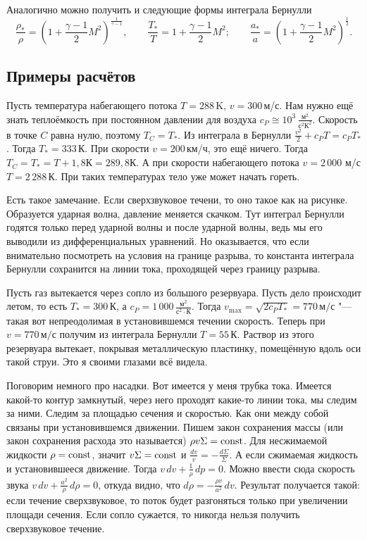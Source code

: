 Аналогично можно получить и следующие формы интеграла Бернулли
\[
  \frac{\rho_*}\rho = \left(1+\frac{\gamma-1}2 M^2\right)^{\frac1{\gamma-1}},\qquad \frac{T_*}T = 1+\frac{\gamma-1}2 M^2;\qquad \frac{a_*}a=\left(1+\frac{\gamma-1}2M^2\right)^{\frac12}.
\]

\subsection{Примеры расчётов}
Пусть температура набегающего потока $T=288$\,K, $v=300$\,м/с. Нам нужно ещё знать теплоёмкость при постоянном давлении для воздуха $c_P\cong 10^3\,\frac{\text{м}^2}{\text{с}^2\text{К}^2}$. Скорость в точке $C$ равна нулю, поэтому $T_C = T_*$. Из интеграла в Бернулли $\frac{v^2}2+c_P T=c_PT_*$. Тогда $T_* = 333\,$К. При скорости $v = 200$\,км/ч, это ещё ничего. Тогда $T_C = T_* = T+1{,}8\text{К}=289{,}8\text{К}$. А при скорости набегающего потока $v = 2\,000\,$\,м/с $T = 2\,288$\,К. При таких температурах тело уже может начать гореть.

Есть такое замечание. Если сверхзвуковое течени, то оно такое как на рисунке. Образуется ударная волна, давление меняется скачком. Тут интеграл Бернулли годятся только перед ударной волны и после ударной волны, ведь мы его выводили из дифференциальных уравнений. Но оказывается, что если внимательно посмотреть на условия на границе разрыва, то константа интеграла Бернулли сохранится на линии тока, проходящей через границу разрыва.

Пусть газ вытекается через сопло из большого резервуара. Пусть дело происходит летом, то есть $T_* = 300$\,К, а $c_P = 1\,000\,\frac{\text{м}^2}{\text{с}^2\cdot \text{К}}$. Тогда $v_{\max} = \sqrt{2 c_P T_*} = 770\,\text{м}/\text{с}$ "--- такая вот непреодолимая в установившемся течении скорость. Теперь при $v=770\,\text{м}/\text{с}$ получим из интеграла Бернулли $T = 55$\,К. Раствор из этого резервуара вытекает, покрывая металлическую пластинку, помещённую вдоль оси такой струи. Это я своими глазами всё видела.

Поговорим немного про насадки. Вот имеется у меня трубка тока. Имеется какой-то контур замкнутый, через него проходят какие-то линии тока, мы следим за ними. Следим за площадью сечения и скоростью. Как они между собой связаны при установившемся движении. Пишем закон сохранения массы (или закон сохранения расхода это называется) $\rho v \Sigma = \operatorname{const}$. Для несжимаемой жидкости  $\rho=\operatorname{const}$, значит $v\Sigma=\operatorname{const}$ и $\frac{dv}{v} = -\frac{d\Sigma}\Sigma$. А если сжимаемая жидкость и установившееся движение. Тогда $v\,dv + \frac1\rho\,dp = 0$. Можно ввести сюда скорость звука $v\,dv + \frac{a^2}\rho\,d\rho = 0$, откуда видно, что $d\rho = -\frac{\rho v}{a^2}\,dv$. Результат получается такой: если течение сверхзвуковое, то поток будет разгоняться только при увеличении площади сечения. Если сопло сужается, то никогда нельзя получить сверхзвуковое течение.


